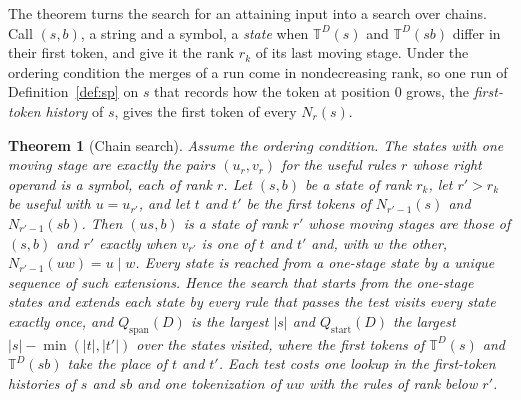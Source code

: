\documentclass[11pt,a4paper]{article}
\theoremstyle{definition}
\theoremstyle{plain}
\newtheorem{theorem}{Theorem}
\newcommand{\T}{\mathbb{T}}
\begin{document}
The theorem turns the search for an attaining input into a search over chains. Call \((s, b)\), a string and a symbol, a
\emph{state} when \(\T^D(s)\) and \(\T^D(sb)\) differ in their first token, and give it the rank \(r_k\) of its last
moving stage. Under the ordering condition the merges of a run come in nondecreasing rank, so one run of
Definition~\ref{def:sp} on \(s\) that records how the token at position \(0\) grows, the \emph{first-token history} of
\(s\), gives the first token of every \(N_r(s)\).


\begin{theorem}[Chain search]\label{thm:chainsearch}
Assume the ordering condition. The states with one moving stage are exactly the pairs \((u_r, v_r)\) for the useful
rules \(r\) whose right operand is a symbol, each of rank \(r\). Let \((s, b)\) be a state of rank \(r_k\), let
\(r' > r_k\) be useful with \(u = u_{r'}\), and let \(t\) and \(t'\) be the first tokens of \(N_{r'-1}(s)\) and
\(N_{r'-1}(sb)\). Then \((us, b)\) is a state of rank \(r'\) whose moving stages are those of \((s, b)\) and \(r'\)
exactly when \(v_{r'}\) is one of \(t\) and \(t'\) and, with \(w\) the other, \(N_{r'-1}(uw) = u \mid w\). Every state
is reached from a one-stage state by a unique sequence of such extensions. Hence the search that starts from the
one-stage states and extends each state by every rule that passes the test visits every state exactly once, and
\(Q_{\mathrm{span}}(D)\) is the largest \(|s|\) and \(Q_{\mathrm{start}}(D)\) the largest \(|s| - \min(|t|, |t'|)\) over
the states visited, where the first tokens of \(\T^D(s)\) and \(\T^D(sb)\) take the place of \(t\) and \(t'\). Each test
costs one lookup in the first-token histories of \(s\) and \(sb\) and one tokenization of \(uw\) with the rules of rank
below \(r'\).
\end{theorem}
\end{document}
